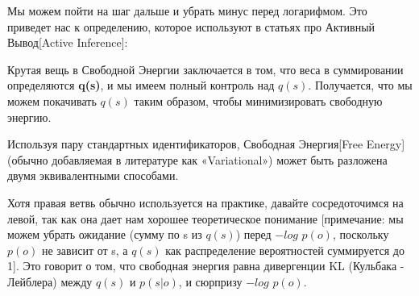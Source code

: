 \documentclass[twoside,leqno, 11pt]{article}
\begin{document}
	Мы можем пойти на шаг дальше и убрать минус перед логарифмом. Это приведет нас к определению, которое используют в статьях про Активный Вывод[Active Inference]:
	
	\begin{figure}[h]
		\label{ris:image}
	\end{figure}
	
	Крутая вещь в Свободной Энергии заключается в том, что веса в суммировании определяются \textbf{q(s)}, и мы имеем полный контроль над $q(s)$. Получается, что мы можем покачивать $q(s)$ таким образом, чтобы минимизировать свободную энергию.
	
	Используя пару стандартных идентификаторов, Свободная Энергия[Free Energy] (обычно добавляемая в литературе как «Variational») может быть разложена двумя эквивалентными способами.
	
	\begin{figure}[h]
		\label{ris:image}
	\end{figure}
	
	Хотя правая ветвь обычно используется на практике, давайте сосредоточимся на левой, так как она дает нам хорошее теоретическое понимание [примечание: мы можем убрать ожидание (сумму по s из $q(s)$) перед $-log$ $p(o)$, поскольку $p(o)$ не зависит от s, а $q(s)$ как распределение вероятностей суммируется до 1]. Это говорит о том, что свободная энергия равна дивергенции KL (Кульбака - Лейблера) между $q(s)$ и $p(s|o)$, и сюрпризу $-log$ $p(o)$.
	
\end{document}
